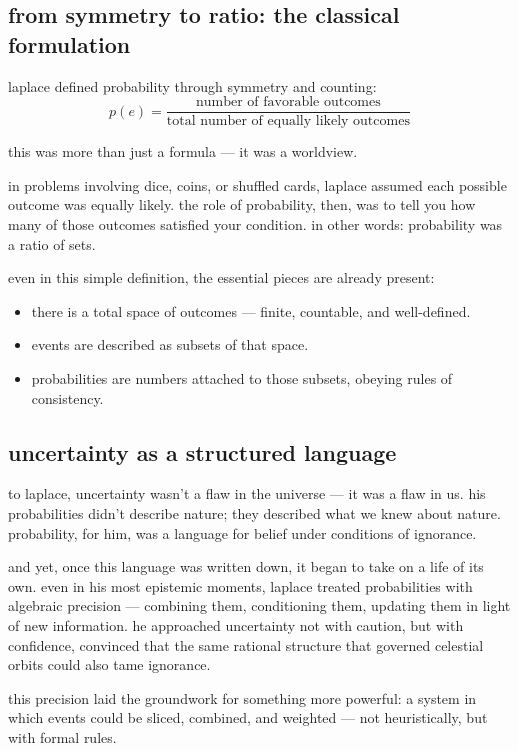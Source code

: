 \subsection{from symmetry to ratio: the classical formulation}

laplace defined probability through symmetry and counting:
\[
p(e) = \frac{\text{number of favorable outcomes}}{\text{total number of equally likely outcomes}}
\]

this was more than just a formula — it was a worldview.

in problems involving dice, coins, or shuffled cards, laplace assumed each possible outcome was equally likely. the role of probability, then, was to tell you how many of those outcomes satisfied your condition. in other words: probability was a ratio of sets.

even in this simple definition, the essential pieces are already present:
\begin{itemize}
    \item there is a total space of outcomes — finite, countable, and well-defined.
    \item events are described as subsets of that space.
    \item probabilities are numbers attached to those subsets, obeying rules of consistency.
\end{itemize}

\subsection{uncertainty as a structured language}

to laplace, uncertainty wasn’t a flaw in the universe — it was a flaw in us. his probabilities didn’t describe nature; they described what we knew about nature. probability, for him, was a language for belief under conditions of ignorance.

and yet, once this language was written down, it began to take on a life of its own. even in his most epistemic moments, laplace treated probabilities with algebraic precision — combining them, conditioning them, updating them in light of new information. he approached uncertainty not with caution, but with confidence, convinced that the same rational structure that governed celestial orbits could also tame ignorance.

this precision laid the groundwork for something more powerful: a system in which events could be sliced, combined, and weighted — not heuristically, but with formal rules.

